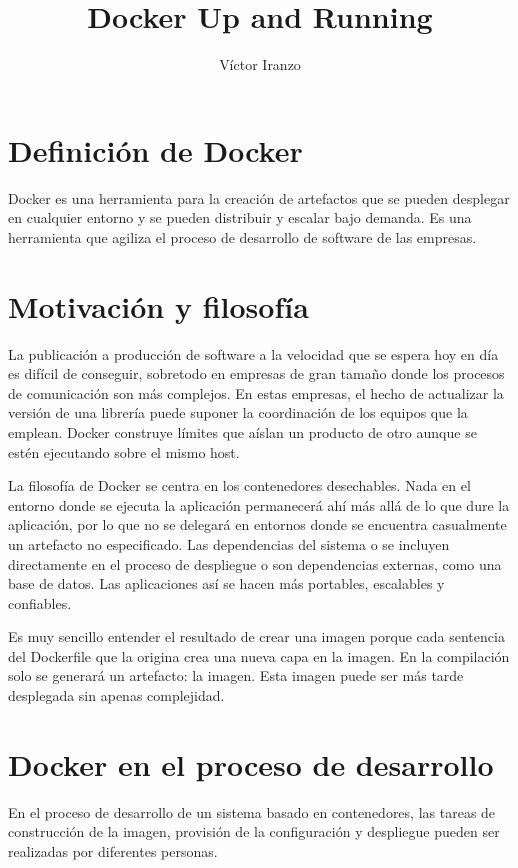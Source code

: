 \documentclass[11pt,a4paper]{article}
\author{Víctor Iranzo}
\title{Docker Up and Running}
\begin{document}
\maketitle

\section{Definición de Docker}

Docker es una herramienta para la creación de artefactos que se pueden desplegar en cualquier entorno y se pueden distribuir y escalar bajo demanda. Es una herramienta que agiliza el proceso de desarrollo de software de las empresas.

\section{Motivación y filosofía}

La publicación a producción de software a la velocidad que se espera hoy en día es difícil de conseguir, sobretodo en empresas de gran tamaño donde los procesos de comunicación son más complejos. En estas empresas, el hecho de actualizar la versión de una librería puede suponer la coordinación de los equipos que la emplean. Docker construye límites que aíslan un producto de otro aunque se estén ejecutando sobre el mismo host.

La filosofía de Docker se centra en los contenedores desechables. Nada en el entorno donde se ejecuta la aplicación permanecerá ahí más allá de lo que dure la aplicación, por lo que no se delegará en entornos donde se encuentra casualmente un artefacto no especificado. Las dependencias del sistema o se incluyen directamente en el proceso de despliegue o son dependencias externas, como una base de datos.  Las aplicaciones así se hacen más portables, escalables y confiables.

Es muy sencillo entender el resultado de crear una imagen porque cada sentencia del Dockerfile que la origina crea una nueva capa en la imagen. En la compilación solo se generará un artefacto: la imagen. Esta imagen puede ser más tarde desplegada sin apenas complejidad.

\section{Docker en el proceso de desarrollo}

En el proceso de desarrollo de un sistema basado en contenedores, las tareas de construcción de la imagen, provisión de la configuración y despliegue pueden ser realizadas por diferentes personas. 
\end{document}
